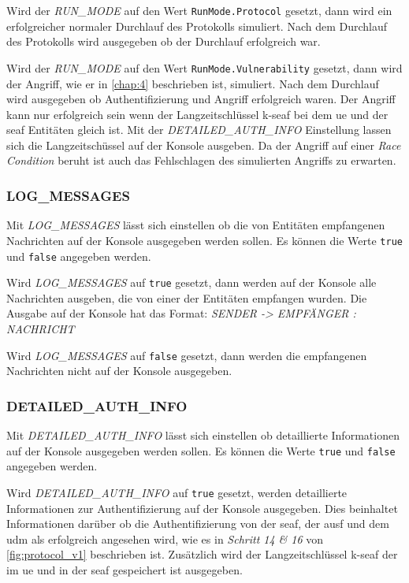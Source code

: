 Wird der \textit{RUN\_MODE} auf den Wert \lstinline{RunMode.Protocol} gesetzt, dann wird ein erfolgreicher normaler Durchlauf des Protokolls simuliert. 
Nach dem Durchlauf des Protokolls wird ausgegeben ob der Durchlauf erfolgreich war.

Wird der \textit{RUN\_MODE} auf den Wert \lstinline{RunMode.Vulnerability} gesetzt, dann wird der Angriff, wie er in \cref{chap:4} beschrieben ist, simuliert.
Nach dem Durchlauf wird ausgegeben ob Authentifizierung und Angriff erfolgreich waren.
Der Angriff kann nur erfolgreich sein wenn der Langzeitschlüssel \gls{k-seaf} bei dem \gls{ue} und der \gls{seaf} Entitäten gleich ist.
Mit der \textit{DETAILED\_AUTH\_INFO} Einstellung lassen sich die Langzeitschüssel auf der Konsole ausgeben.
Da der Angriff auf einer \textit{Race Condition} beruht ist auch das Fehlschlagen des simulierten Angriffs zu erwarten.

\subsubsection{LOG\_MESSAGES}

Mit \textit{LOG\_MESSAGES} lässt sich einstellen ob die von Entitäten empfangenen Nachrichten auf der Konsole ausgegeben werden sollen.
Es können die Werte \lstinline{true} und \lstinline{false} angegeben werden.

Wird \textit{LOG\_MESSAGES} auf \lstinline{true} gesetzt, dann werden auf der Konsole alle Nachrichten ausgeben, die von einer der Entitäten empfangen wurden.
Die Ausgabe auf der Konsole hat das Format: \textit{SENDER -> EMPFÄNGER : NACHRICHT}

Wird \textit{LOG\_MESSAGES} auf \lstinline{false} gesetzt, dann werden die empfangenen Nachrichten nicht auf der Konsole ausgegeben.

\subsubsection{DETAILED\_AUTH\_INFO}

Mit \textit{DETAILED\_AUTH\_INFO} lässt sich einstellen ob detaillierte Informationen auf der Konsole ausgegeben werden sollen.
Es können die Werte \lstinline{true} und \lstinline{false} angegeben werden.

Wird \textit{DETAILED\_AUTH\_INFO} auf \lstinline{true} gesetzt, werden detaillierte Informationen zur Authentifizierung auf der Konsole ausgegeben.
Dies beinhaltet Informationen darüber ob die Authentifizierung von der \gls{seaf}, der \gls{ausf} und dem \gls{udm} als erfolgreich angesehen wird, wie es in \textit{Schritt 14 \& 16} von \cref{fig:protocol_v1} beschrieben ist.
Zusätzlich wird der Langzeitschlüssel \gls{k-seaf} der im \gls{ue} und in der \gls{seaf} gespeichert ist ausgegeben.

